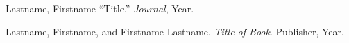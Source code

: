 %
%
\renewcommand{\bibname}{References}
\begin{thereferences}
Lastname, Firstname  ``Title.''  \textit{Journal}, Year.

Lastname, Firstname, and Firstname Lastname.  \textit{Title of Book}.  Publisher, Year.
\end{thereferences}
